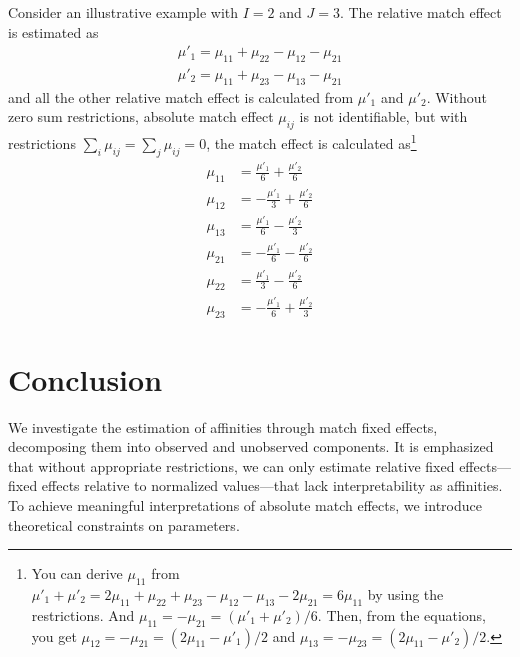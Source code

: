 \documentclass[12pt]{article}
\begin{document}
Consider an illustrative example with $I=2$ and $J=3$. The relative match effect is estimated as
\begin{align*}
    \mu'_1 = \mu_{11}+\mu_{22}-\mu_{12}-\mu_{21} \\
    \mu'_2 = \mu_{11} +\mu_{23} -\mu_{13} -\mu_{21}
\end{align*}
and all the other relative match effect is calculated from $\mu'_1$ and $\mu'_2$. Without zero sum restrictions, absolute match effect $\mu_{ij}$ is not identifiable, but with restrictions $\sum_i\mu_{ij}=\sum_j\mu_{ij}=0$, the match effect is calculated as\footnote{You can derive $\mu_{11}$ from $\mu'_1+\mu'_2=2\mu_{11}+\mu_{22}+\mu_{23}-\mu_{12}-\mu_{13}-2\mu_{21}=6\mu_{11}$ by using the restrictions. And $\mu_{11}=-\mu_{21}=(\mu'_1+\mu'_2)/6$. Then, from the equations, you get $\mu_{12}=-\mu_{21}=(2\mu_{11}-\mu'_1)/2$ and $\mu_{13}=-\mu_{23}=(2\mu_{11}-\mu'_2)/2$. }
\begin{align*}
     \mu_{11} &= \frac{\mu'_{1}}{6} + \frac{\mu'_{2}}{6}\\
     \mu_{12} &= - \frac{\mu'_{1}}{3} + \frac{\mu'_{2}}{6}\\
     \mu_{13} &= \frac{\mu'_{1}}{6} - \frac{\mu'_{2}}{3}\\
     \mu_{21} &= - \frac{\mu'_{1}}{6} - \frac{\mu'_{2}}{6}\\
     \mu_{22} &= \frac{\mu'_{1}}{3} - \frac{\mu'_{2}}{6}\\
     \mu_{23} &= - \frac{\mu'_{1}}{6} + \frac{\mu'_{2}}{3}
\end{align*}








\section{Conclusion}
We investigate the estimation of affinities through match fixed effects, decomposing them into observed and unobserved components. It is emphasized that without appropriate restrictions, we can only estimate relative fixed effects—fixed effects relative to normalized values—that lack interpretability as affinities. To achieve meaningful interpretations of absolute match effects, we introduce theoretical constraints on parameters.
\end{document}
